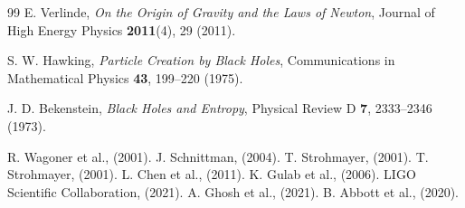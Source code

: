 \documentclass[12pt,a4paper]{article}
\begin{document}
\begin{thebibliography}{99}
		E. Verlinde, \emph{On the Origin of Gravity and the Laws of Newton}, Journal of High Energy Physics \textbf{2011}(4), 29 (2011).
		
		S. W. Hawking, \emph{Particle Creation by Black Holes}, Communications in Mathematical Physics \textbf{43}, 199–220 (1975).
		
		J. D. Bekenstein, \emph{Black Holes and Entropy}, Physical Review D \textbf{7}, 2333–2346 (1973).
		
		 R. Wagoner et al., (2001).
		 J. Schnittman, (2004).
		 T. Strohmayer, (2001).
		 T. Strohmayer, (2001).
		 L. Chen et al., (2011).
		 K. Gulab et al., (2006).
		 LIGO Scientific Collaboration, (2021).
		 A. Ghosh et al., (2021).
		 B. Abbott et al., (2020).
		
	\end{thebibliography}
	
\end{document}
